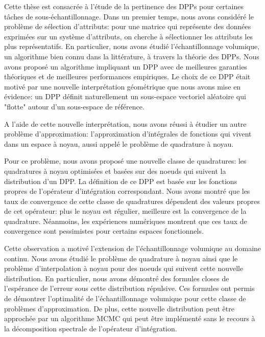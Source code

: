 \documentclass[twoside,11pt]{book}
\numberwithin{theorem}{chapter}
\numberwithin{definition}{chapter}
\numberwithin{proposition}{chapter}
\numberwithin{corollary}{chapter}
\numberwithin{example}{chapter}
\numberwithin{lemma}{chapter}
\numberwithin{assumption}{chapter}
\numberwithin{equation}{chapter}
\numberwithin{figure}{chapter}
\begin{document}
Cette thèse est consacrée à l'étude de la pertinence des DPPs pour certaines tâches de sous-échantillonnage.
Dans un premier temps, nous avons considéré le problème de sélection d'attributs: pour une matrice qui représente des données exprimées sur un système d'attributs, on cherche à sélectionner les attributs les plus représentatifs. En particulier, nous avons étudié l'échantillonnage volumique, un algorithme bien connu dans la littérature, à travers la théorie des DPPs. Nous avons proposé un algorithme impliquant un DPP avec de meilleures garanties théoriques et de meilleures performances empiriques. Le choix de ce DPP était motivé par une nouvelle interprétation géométrique que nous avons mise en évidence: un DPP définit naturellement un sous-espace vectoriel aléatoire qui "flotte" autour d'un sous-espace de référence. 

A l'aide de cette nouvelle interprétation, nous avons réussi à étudier un autre problème d'approximation: l'approximation d'intégrales de fonctions qui vivent dans un espace à noyau, aussi appelé le problème de quadrature à noyau.

Pour ce problème, nous avons proposé une nouvelle classe de quadratures: les quadratures à noyau optimisées et  basées sur des noeuds qui suivent la distribution d'un DPP. La définition de ce DPP est basée sur les fonctions propres de l'opérateur d'intégration correspondant. Nous avons montré que les taux de convergence de cette classe de quadratures dépendent des valeurs propres de cet opérateur: plus le noyau est régulier, meilleure est la convergence de la quadrature. Néanmoins, les expériences numériques montrent que ces taux de convergence sont pessimistes pour certains espaces fonctionnels.

Cette observation a motivé l'extension de l'échantillonnage volumique au domaine continu. Nous avons étudié le problème de quadrature à noyau ainsi que le problème d’interpolation à noyau pour des noeuds qui suivent cette nouvelle distribution. En particulier, nous avons démontré des formules closes de l'espérance de l'erreur sous cette distribution répulsive. Ces formules ont permis de démontrer l'optimalité de l’échantillonnage volumique pour cette classe de problèmes d'approximation. De plus, cette nouvelle distribution peut être approchée par un algorithme MCMC qui peut être implémenté sans le recours à la décomposition spectrale de l'opérateur d'intégration.
\end{document}
